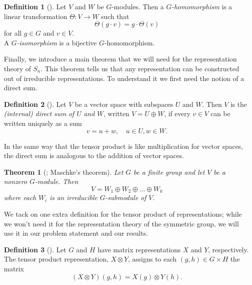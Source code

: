 \documentclass[12pt,twoside]{reedthesis}
\theoremstyle{plain}   %
\newtheorem{thm}{Theorem}[section] %
\theoremstyle{definition}
\newtheorem{defn}{Definition}[section]
\theoremstyle{remark}
\numberwithin{equation}{section}
\begin{document}
  \begin{defn}[{\cite[Definition 1.6.1]{sagan}}]
    Let $V$ and $W$ be $G$-modules. Then a \emph{$G$-homomorphism} is a linear transformation $\Theta: V \to W$ such that
    \[\Theta(g \cdot v) = g \cdot \Theta(v)\]
    for all $g \in G$ and $v \in V$.\\
    A \emph{$G$-isomorphism} is a bijective $G$-homomorphism.
  \end{defn}

  Finally, we introduce a main theorem that we will need for the representation theory of $S_n$.
  This theorem tells us that any representation can be constructed out of irreducible representations.
  To understand it we first need the notion of a direct sum.
  \begin{defn}[{\cite[Definition 1.5.1]{sagan}}]
    Let $V$ be a vector space with subspaces $U$ and $W$.
    Then $V$ is the \emph{(internal) direct sum of $U$ and $W$}, written $V = U \oplus W$, if every $v \in V$ can be
    written uniquely as a sum
    \[v= u +w, \quad u \in U, w \in W.\]
  \end{defn}
  In the same way that the tensor product is like multiplication for vector spaces, the direct sum is analogous to the addition of vector spaces.
  \begin{thm}[{\cite[Theorem 1.5.3]{sagan}; Maschke's theorem}]
    Let $G$ be a finite group and let $V$ be a nonzero $G$-module. Then
    \[ V = W_1 \oplus W_2 \oplus \dots \oplus W_k\]
    where each $W_i$ is an irreducible $G$-submodule of $V$.
  \end{thm}

  We tack on one extra definition for the tensor product of representations; while we won't need it for the representation theory of the symmetric group,
  we will use it in our problem statement and our results.
  \begin{defn}[{\cite[Definition 1.11.1]{sagan}}]
    Let $G$ and $H$ have matrix representations $X$ and $Y$, respectively. The tensor product representation, $X  \otimes Y$, assigns to each $(g, h) \in G \times H$ the matrix
    \[( X \otimes Y) (g,h) = X(g)  \otimes Y(h). \]
  \end{defn}
\end{document}
